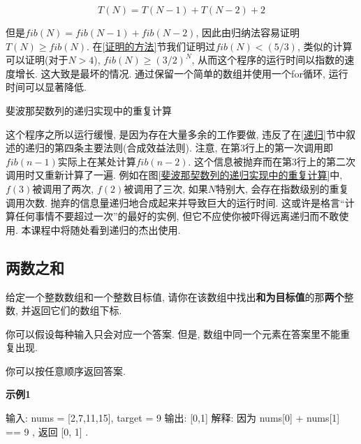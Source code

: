 \documentclass[oneside]{ctexbook}
\begin{document}
{\begin{equation*}
T(N)=T(N-1)+T(N-2)+2
\end{equation*}

但是$fib(N)=fib(N-1)+fib(N-2)$, 因此由归纳法容易证明$T(N)\geq fib(N)$. 在\ref{证明的方法}节我们证明过$fib(N)<(5/3)$, 类似的计算可以证明(对于$N>4$), $fib(N)\geq (3/2)^N$, 从而这个程序的运行时间以指数的速度增长. 这大致是最坏的情况. 通过保留一个简单的数组并使用一个for循环, 运行时间可以显著降低.

\begin{myfigure}[label={斐波那契数列的递归实现中的重复计算}]{斐波那契数列的递归实现中的重复计算}
\end{myfigure}

这个程序之所以运行缓慢, 是因为存在大量多余的工作要做, 违反了在\ref{递归}节中叙述的递归的第四条主要法则(合成效益法则). 注意, 在第3行上的第一次调用即$fib(n-1)$实际上在某处计算$fib(n-2)$. 这个信息被抛弃而在第3行上的第二次调用时又重新计算了一遍. 例如在图\ref{斐波那契数列的递归实现中的重复计算}中, $f(3)$被调用了两次, $f(2)$被调用了三次, 如果$N$特别大, 会存在指数级别的重复调用次数. 抛弃的信息量递归地合成起来并导致巨大的运行时间. 这或许是格言``计算任何事情不要超过一次''的最好的实例, 但它不应使你被吓得远离递归而不敢使用. 本课程中将随处看到递归的杰出使用.

\subsection{两数之和{}}

给定一个整数数组和一个整数目标值, 请你在该数组中找出\textbf{和为目标值}的那\textbf{两个}整数, 并返回它们的数组下标.

你可以假设每种输入只会对应一个答案. 但是, 数组中同一个元素在答案里不能重复出现.

你可以按任意顺序返回答案.

\textbf{示例1}

\begin{mytext}
输入: nums = [2,7,11,15], target = 9
输出: [0,1]
解释: 因为 nums[0] + nums[1] == 9 , 返回 [0, 1] .
\end{mytext}

}
\end{document}
